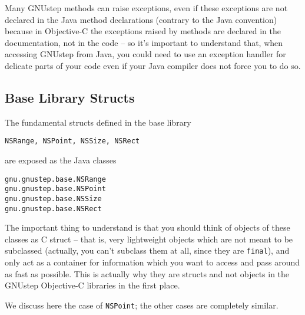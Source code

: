 Many GNUstep methods can raise exceptions, even if these exceptions
are not declared in the Java method declarations (contrary to the Java
convention) because in Objective-C the exceptions raised by methods
are declared in the documentation, not in the code -- so it's
important to understand that, when accessing GNUstep from Java, you
could need to use an exception handler for delicate parts of your code
even if your Java compiler does not force you to do so.

\subsection{Base Library Structs}
The fundamental structs defined in the base library
\begin{verbatim}
NSRange, NSPoint, NSSize, NSRect
\end{verbatim}
are exposed as the Java classes
\begin{verbatim}
gnu.gnustep.base.NSRange
gnu.gnustep.base.NSPoint
gnu.gnustep.base.NSSize
gnu.gnustep.base.NSRect
\end{verbatim}
The important thing to understand is that you should think of objects
of these classes as C struct -- that is, very lightweight objects
which are not meant to be subclassed (actually, you can't subclass
them at all, since they are \texttt{final}), and only act as a
container for information which you want to access and pass around as
fast as possible.  This is actually why they are structs and not
objects in the GNUstep Objective-C libraries in the first place.

We discuss here the case of \texttt{NSPoint}; the other cases are
completely similar.

